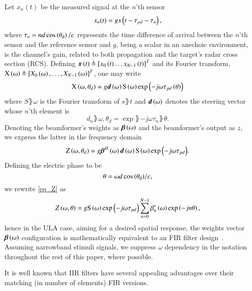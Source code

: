 \par Let $x_{n}(t)$ be the measured signal at the $n$'th sensor
\begin{equation}
x_{n}(t) = gs\left({t-\tau_{pd}-\tau_{n}}\right),
\label{eqn:noFeedbackULA_singleSensor_temporal}
\end{equation}
where $\tau_{n}=nd\cos\left({\theta_{\text{d}}}\right)/c$ represents the time difference of arrival between the $n$'th sensor and the reference sensor and $g$, being a scalar in an anechoic environment, is the channel's gain, related to both propagation and the target's radar cross section (RCS).
Defining $\boldsymbol{x}\left({t}\right)\triangleq\left[{x_{0}\left({t}\right)\hdots{}x_{N-1}\left({t}\right)}\right]^{T}$ and its Fourier transform, $\vecnot{\F{x}}\rBrace{\omega}\triangleq\vBrace{X_{0}\rBrace{\omega},\hdots,X_{N-1}\rBrace{\omega}}^{T}$, one may write 
\[
\vecnot{\F{x}}\rBrace{\omega,\theta_{d}}=g\vecnot{d}\rBrace{\omega}\F{s}\rBrace{\omega}\exp{\rBrace{-j\omega\tau_{pd}\rBrace{\theta}}}
\]
where $S\rBrace{\omega}$ is the Fourier transform of $s\rBrace{t}$ and $\boldsymbol{d}\left({\omega}\right)$ denotes the steering vector whose $n$'th element is
\begin{equation}
    \label{eq:d}
    d_{n}\rBrace{\omega,\theta_{d}} = \exp{\rBrace{-j\omega\tau_{n}\rBrace{\theta}}}.
\end{equation}
Denoting the beamformer's weights as $\boldsymbol{\beta}\left({\omega}\right)$ and the beamformer's output as $z$, we express the latter in the frequency domain
\begin{equation}
    \label{eq_Z}
    Z\rBrace{\omega,\theta_{d}} = g\vecnot{\beta}^{H}\rBrace{\omega}\vecnot{d}\rBrace{\omega}\F{s}\rBrace{\omega}\exp{\rBrace{-j\omega\tau_{pd}}}.
\end{equation}
Defining the electric phase to be
\begin{equation}\label{eq:thetaULA}
\theta=\omega{d\cos\left({\theta_{\text{d}}}\right)}/{c},
\end{equation}
we rewrite \eqref{eq_Z} as 
\[
Z\rBrace{\omega,\theta} = g\F{s}\rBrace{\omega}\exp{\rBrace{-j\omega\tau_{pd}}}\sum_{n=0}^{N-1}\beta^{*}_{n}\rBrace{\omega}\exp\Brack{-jn\theta},
\]
hence in the ULA case, aiming for a desired spatial response, the weights vector $\boldsymbol{\beta}\left({\omega}\right)$ configuration is mathematically equivalent to an FIR filter design~\cite{van1988beamforming,benesty2018}. 
Assuming narrowband stimuli signals, we suppress $\omega$ dependency in the notation throughout the rest of this paper, where possible.
\par It is well known \cite{rabiner1974some} that IIR filters have several appealing advantages over their matching (in number of elements) FIR versions.
